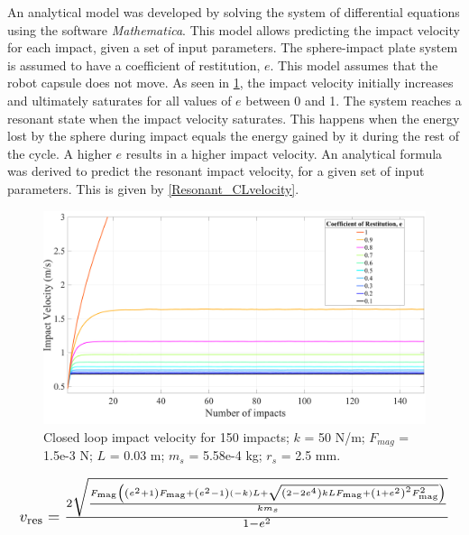 \documentclass[letterpaper, 10 pt, conference]{ieeeconf}  %
\begin{document}
An analytical model was developed by solving the system of differential equations using the software \emph{Mathematica}. This model allows predicting the impact velocity for each impact, given a set of input parameters. The sphere-impact plate system is assumed to have a coefficient of restitution, $e$. This model assumes that the robot capsule does not move. As seen in \cref{Closedloop_Impact_velocity}, the impact velocity initially increases and ultimately saturates for all values of $e$ between 0 and 1. The system reaches a resonant state when the impact velocity saturates. This happens when the energy lost by the sphere during impact equals the energy gained by it during the rest of the cycle. A higher $e$ results in a higher impact velocity.  An analytical formula was derived to predict the resonant impact velocity, for a given set of input parameters. This is given by \cref{Resonant_CLvelocity}.
\begin{figure}
	\includegraphics[width=\linewidth]{Closedloop_Impact_velocity.pdf}
	\caption{Closed loop impact velocity for 150 impacts; $k$ = 50 N/m; $F_{mag}$ = 1.5e-3 N; $L$ = 0.03 m; $m_s$ = 5.58e-4 kg; $r_s$ = 2.5 mm.}
	\label{Closedloop_Impact_velocity}
	\vspace{-1.5em}
	
\end{figure}
\begin{equation}
\resizebox{\linewidth}{!}
{$
	v_{\text{res}}=\frac{2 \sqrt{\frac{F_{\text{mag}} \left(\left(e^2+1\right) F_{\text{mag}}+\left(e^2-1\right) (-k) L+\sqrt{\left(2-2 e^4\right) k L F_{\text{mag}}+\left(1+e^2\right)^2 F_{\text{mag}}^2}\right)}{k m_s}}}{1-e^2}
	$}
\label{Resonant_CLvelocity}
\end{equation}
\end{document}
